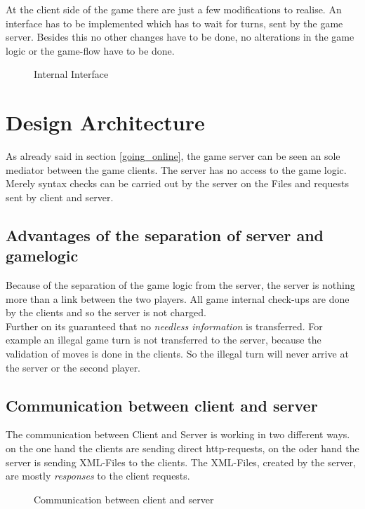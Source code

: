 At the client side of the game there are just a few modifications to realise.
An interface has to be implemented which has to wait for turns, sent by the
game server. Besides this no other changes have to be done, no alterations in
the game logic or the game-flow have to be done.

\begin{figure}[h]
\begin{center}
\caption{Internal Interface}
\end{center}
\end{figure}


\section{Design Architecture} \label{Architecture}
As already said in section \ref{going_online}, the game server can be seen an
sole mediator between the game clients. The server has no access to the game
logic. Merely syntax checks can be carried out by the server on the Files and
requests sent by client and server.

\subsection{Advantages of the separation of server and gamelogic}
Because of the separation of the game logic from the server, the server is
nothing more than a link between the two players. All game internal check-ups
are done by the clients and so the server is not charged.\\
Further on its guaranteed that no \textit{needless information} is transferred.
For example an illegal game turn is not transferred to the server, because the
validation of moves is done in the clients. So the illegal turn will never
arrive at the server or the second player. \\

\subsection{Communication between client and server}
The communication between Client and Server is working in two different ways.
on the one hand the clients are sending direct http-requests, on the oder hand
the server is sending XML-Files to the clients. The XML-Files, created by the
server, are mostly \textit{responses} to the client requests.

\begin{figure}[h]
\begin{center}
\caption{Communication between client and server}
\end{center}
\end{figure}

